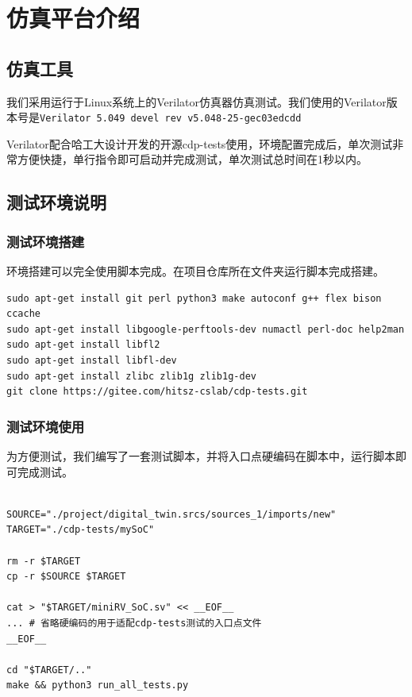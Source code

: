 \documentclass[12pt,a4paper]{ctexart}
\newcommand{\code}[1]{\texttt{#1}}
\begin{document}


\tableofcontents

\newpage

\section{仿真平台介绍}

\subsection{仿真工具}


我们采用运行于Linux系统上的Verilator仿真器仿真测试。我们使用的Verilator版本号是\code{Verilator 5.049 devel rev v5.048-25-gec03edcdd}

Verilator配合哈工大设计开发的开源cdp-tests使用，环境配置完成后，单次测试非常方便快捷，单行指令即可启动并完成测试，单次测试总时间在1秒以内。

\subsection{测试环境说明}

\subsubsection{测试环境搭建}

环境搭建可以完全使用脚本完成。在项目仓库所在文件夹运行脚本完成搭建。

\begin{lstlisting}[style=bashstyle]
sudo apt-get install git perl python3 make autoconf g++ flex bison ccache
sudo apt-get install libgoogle-perftools-dev numactl perl-doc help2man
sudo apt-get install libfl2
sudo apt-get install libfl-dev
sudo apt-get install zlibc zlib1g zlib1g-dev
git clone https://gitee.com/hitsz-cslab/cdp-tests.git
\end{lstlisting}

\subsubsection{测试环境使用}

为方便测试，我们编写了一套测试脚本，并将入口点硬编码在脚本中，运行脚本即可完成测试。

\begin{lstlisting}[style=bashstyle]

SOURCE="./project/digital_twin.srcs/sources_1/imports/new"
TARGET="./cdp-tests/mySoC"

rm -r $TARGET
cp -r $SOURCE $TARGET

cat > "$TARGET/miniRV_SoC.sv" << __EOF__
... # 省略硬编码的用于适配cdp-tests测试的入口点文件
__EOF__

cd "$TARGET/.."
make && python3 run_all_tests.py

\end{lstlisting}
\end{document}
